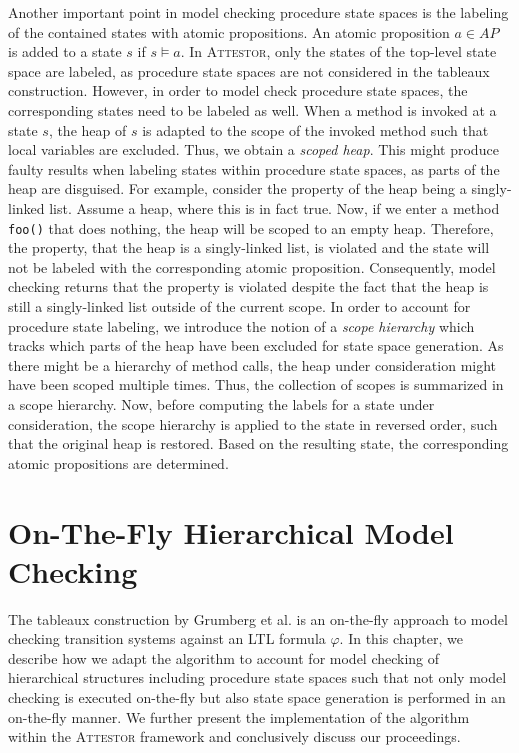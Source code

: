 \documentclass[a4paper, 12pt, twoside]{report}
\begin{document}
	Another important point in model checking procedure state spaces is the labeling of the contained states with atomic propositions. An atomic proposition $a \in AP$ is added to a state $s$ if $s \models a$. In \textsc{Attestor}, only the states of the top-level state space are labeled, as procedure state spaces are not considered in the tableaux construction. However, in order to model check procedure state spaces, the corresponding states need to be labeled as well. When a method is invoked at a state $s$, the heap of $s$ is adapted to the scope of the invoked method such that local variables are excluded. Thus, we obtain a \textit{scoped heap}. This might produce faulty results when labeling states within procedure state spaces, as parts of the heap are disguised. For example, consider the property of the heap being a singly-linked list. Assume a heap, where this is in fact true. Now, if we enter a method \texttt{foo()} that does nothing, the heap will be scoped to an empty heap. Therefore, the property, that the heap is a singly-linked list, is violated and the state will not be labeled with the corresponding atomic proposition. Consequently, model checking returns that the property is violated despite the fact that the heap is still a singly-linked list outside of the current scope. In order to account for procedure state labeling, we introduce the notion of a \textit{scope hierarchy} which tracks which parts of the heap have been excluded for state space generation. As there might be a hierarchy of method calls, the heap under consideration might have been scoped multiple times. Thus, the collection of scopes is summarized in a scope hierarchy. Now, before computing the labels for a state under consideration, the scope hierarchy is applied to the state in reversed order, such that the original heap is restored. Based on the resulting state, the corresponding atomic propositions are determined.
	
	\chapter{On-The-Fly Hierarchical Model Checking}\label{chp:otf}
	
	The tableaux construction by Grumberg et al. \cite{bhat1995efficient} is an on-the-fly approach to model checking transition systems against an LTL formula $\varphi$. In this chapter, we describe how we adapt the algorithm to account for model checking of hierarchical structures including procedure state spaces such that not only model checking is executed on-the-fly but also state space generation is performed in an on-the-fly manner. We further present the implementation of the algorithm within the \textsc{Attestor} framework and conclusively discuss our proceedings.
	
\end{document}
